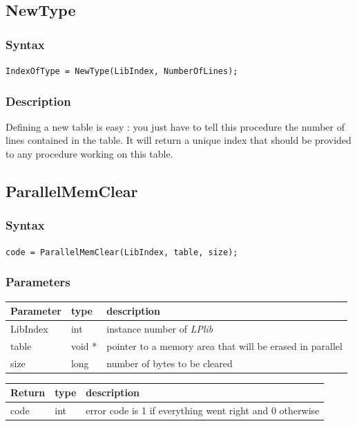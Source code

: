 \documentclass[a4paper,12pt]{article}
\begin{document}
\subsection{NewType}

\subsubsection*{Syntax}
\tt{IndexOfType = NewType(LibIndex, NumberOfLines);}
\normalfont

\subsubsection*{Description}
Defining a new table is easy : you just have to tell this procedure the number of lines contained in the table. It will return a unique index that should be provided to any procedure working on this table.


\subsection{ParallelMemClear}

\subsubsection*{Syntax}
\tt{code = ParallelMemClear(LibIndex, table, size);}
\normalfont

\subsubsection*{Parameters}
\begin{tabular}{|m{2cm}|m{1.5cm}|m{10.5cm}|}
\hline
Parameter  & type   & description \\
\hline
LibIndex   & int    & instance number of \emph{LPlib} \\
\hline
table      & void * & pointer to a memory area that will be erased in parallel \\
\hline
size       & long   & number of bytes to be cleared \\
\hline
\end{tabular}

\medskip

\noindent
\begin{tabular}{|m{2cm}|m{1.5cm}|m{10.5cm}|}
\hline
Return     & type   & description \\
\hline
code       & int    & error code is 1 if everything went right and 0 otherwise \\
\hline
\end{tabular}
\end{document}
